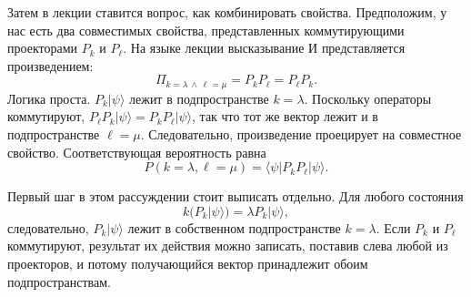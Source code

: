 \begin{classroomqa}
\end{classroomqa}

\begin{classroomqa}
\end{classroomqa}

Затем в лекции ставится вопрос, как комбинировать свойства. Предположим, у нас есть два совместимых свойства, представленных коммутирующими проекторами \(P_k\) и \(P_\ell\). На языке лекции высказывание И представляется произведением:
\begin{equation}
\Pi_{k=\lambda\,\wedge\,\ell=\mu}=P_kP_\ell=P_\ell P_k.
\end{equation}
Логика проста. \(P_k|\psi\rangle\) лежит в подпространстве \(k=\lambda\). Поскольку операторы коммутируют, \(P_\ell P_k|\psi\rangle=P_kP_\ell|\psi\rangle\), так что тот же вектор лежит и в подпространстве \(\ell=\mu\). Следовательно, произведение проецирует на совместное свойство. Соответствующая вероятность равна
\begin{equation}
P(k=\lambda,\ell=\mu)=\langle\psi|P_kP_\ell|\psi\rangle.
\end{equation}

Первый шаг в этом рассуждении стоит выписать отдельно. Для любого состояния
\begin{equation}
k\bigl(P_k|\psi\rangle\bigr)=\lambda P_k|\psi\rangle,
\end{equation}
следовательно, \(P_k|\psi\rangle\) лежит в собственном подпространстве \(k=\lambda\). Если \(P_k\) и \(P_\ell\) коммутируют, результат их действия можно записать, поставив слева любой из проекторов, и потому получающийся вектор принадлежит обоим подпространствам.

